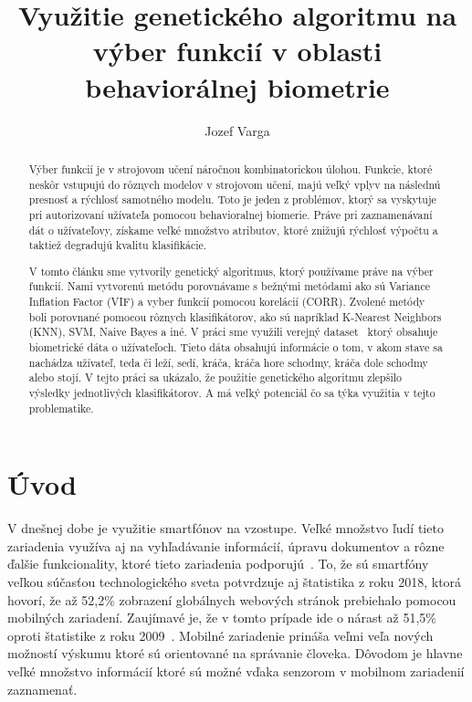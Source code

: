 \documentclass[runningheads]{llncs}
\begin{document}
%
\title{Využitie genetického algoritmu na výber funkcií v oblasti behaviorálnej biometrie}
%
%
\author{Jozef Varga}
%
%
\maketitle              %
%
\begin{abstract}
    Výber funkcií je v strojovom učení náročnou kombinatorickou úlohou. 
    Funkcie, ktoré neskôr vstupujú do rôznych modelov v strojovom učení, majú
    veľký vplyv na následnú presnosť a rýchlosť samotného modelu. Toto je jeden z problémov,
    ktorý sa vyskytuje pri autorizovaní užívateľa pomocou behavioralnej biomerie. Práve pri
    zaznamenávaní dát o užívateľovy, získame veľké množstvo atributov, ktoré znižujú rýchlosť výpočtu
    a taktiež degradujú kvalitu klasifikácie. 
    
    V tomto článku sme vytvorily genetický algoritmus, ktorý používame práve na výber funkcií. Nami vytvorenú
    metódu porovnávame s bežnými metódami ako sú Variance Inflation Factor (VIF) a vyber funkcií pomocou korelácií (CORR). 
    Zvolené metódy boli porovnané pomocou rôznych klasifikátorov, ako sú napríklad K-Nearest Neighbors (KNN), SVM, Naive Bayes a iné. 
    V práci sme využili verejný dataset~\cite{ref_dataset_anguita,ref_dataset} ktorý obsahuje biometrické dáta o 
    užívateľoch. Tieto dáta obsahujú informácie o tom, v akom stave sa nachádza užívateľ, teda či leží, sedí, 
    kráča,  kráča hore schodmy, kráča dole schodmy alebo stojí.
    V tejto práci sa ukázalo, že použitie genetického algoritmu zlepšilo výsledky jednotlivých klasifikátorov. 
    A má veľký potenciál čo sa týka využitia v tejto problematike.

\end{abstract}
%

\section{Úvod}

V dnešnej dobe je využitie smartfónov na vzostupe. 
Veľké množstvo ľudí tieto zariadenia využíva aj na vyhľadávanie informácií, 
úpravu dokumentov a rôzne ďalšie funkcionality, 
ktoré tieto zariadenia podporujú~\cite{ref_bomhold}. 
To, že sú smartfóny veľkou súčasťou technologického sveta potvrdzuje aj 
štatistika z roku 2018, ktorá hovorí, že až 52,2\% 
zobrazení globálnych webových stránok prebiehalo pomocou mobilných zariadení. 
Zaujímavé je, že v tomto prípade ide o nárast až 51,5\% 
oproti štatistike z roku 2009~\cite{ref_statista19}. Mobilné zariadenie
prináša veľmi veľa nových možností výskumu ktoré sú orientované na správanie človeka.
Dôvodom je hlavne veľké množstvo informácií ktoré sú možné vďaka senzorom v mobilnom 
zariadenií zaznamenať. 
\end{document}

